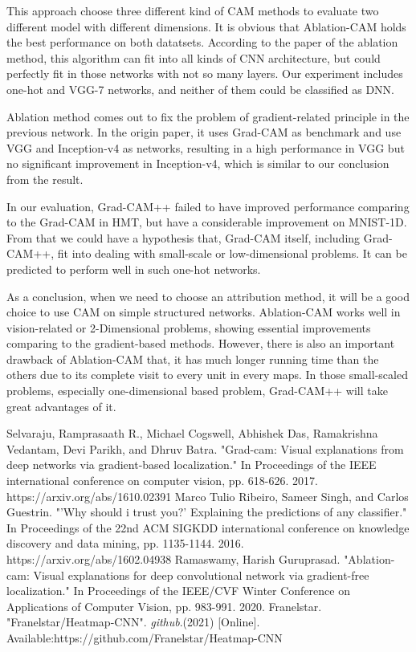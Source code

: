 \documentclass[conference]{IEEEtran}
\begin{document}
This approach choose three different kind of CAM methods to evaluate two different model with different dimensions. It is obvious that Ablation-CAM holds the best performance on both datatsets. According to the paper of the ablation method, this algorithm can fit into all kinds of CNN architecture, but could perfectly fit in those networks with not so many layers. Our experiment includes one-hot and VGG-7 networks, and neither of them could be classified as DNN.\par
Ablation method comes out to fix the problem of gradient-related principle in the previous network. In the origin paper, it uses Grad-CAM as benchmark and use VGG and Inception-v4 as networks, resulting in a high performance in VGG but no significant improvement in Inception-v4, which is similar to our conclusion from the result.\par
In our evaluation, Grad-CAM++ failed to have improved performance comparing to the Grad-CAM in HMT, but have a considerable improvement on MNIST-1D. From that we could have a hypothesis that, Grad-CAM itself, including Grad-CAM++, fit into dealing with small-scale or low-dimensional problems. It can be predicted to perform well in such one-hot networks.\par
As a conclusion, when we need to choose an attribution method, it will be a good choice to use CAM on simple structured networks. Ablation-CAM works well in vision-related or 2-Dimensional problems, showing essential improvements comparing to the gradient-based methods. However, there is also an important drawback of Ablation-CAM that, it has much longer running time than the others due to its complete visit to every unit in every maps. In those small-scaled problems, especially one-dimensional based problem, Grad-CAM++ will take great advantages of it.

\begin{thebibliography}{00}
Selvaraju, Ramprasaath R., Michael Cogswell, Abhishek Das, Ramakrishna Vedantam, Devi Parikh, and Dhruv Batra. "Grad-cam: Visual explanations from deep networks via gradient-based localization." In Proceedings of the IEEE international conference on computer vision, pp. 618-626. 2017. https://arxiv.org/abs/1610.02391
 Marco Tulio Ribeiro, Sameer Singh, and Carlos Guestrin. "'Why should i trust you?' Explaining the predictions of any classifier." In Proceedings of the 22nd ACM SIGKDD international conference on knowledge discovery and data mining, pp. 1135-1144. 2016. https://arxiv.org/abs/1602.04938
 Ramaswamy, Harish Guruprasad. "Ablation-cam: Visual explanations for deep convolutional 
network via gradient-free localization." In Proceedings of the IEEE/CVF Winter Conference on Applications of Computer Vision, pp. 983-991. 2020. 
Franelstar. "Franelstar/Heatmap-CNN". \textit{github}.(2021) [Online]. Available:https://github.com/Franelstar/Heatmap-CNN


\end{thebibliography}
\end{document}
